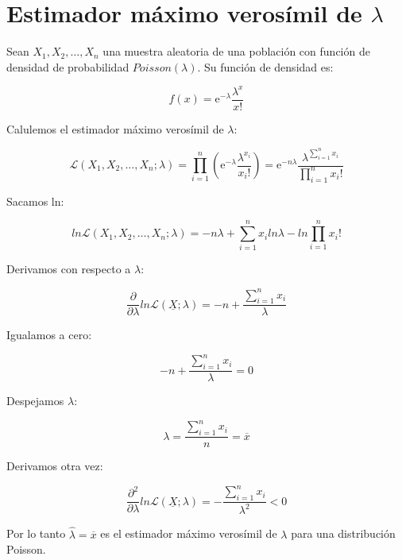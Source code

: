 \section{Estimador máximo verosímil de $\lambda$} \label{Apend_ResultadosUtiles}

Sean $X_{1}, X_{2}, \ldots, X_{n}$ una muestra aleatoria de una población con función de densidad de probabilidad $Poisson(\lambda)$. Su función de densidad es:

$$f(x) = \mathrm{e}^{-\lambda} \dfrac{\lambda^{x}}{x!}$$

Calulemos el estimador máximo verosímil de $\lambda$:

$$\mathcal{L}(X_{1}, X_{2},\ldots, X_{n}; \lambda) = \displaystyle \prod_{i = 1}^{n} \left( \mathrm{e}^{-\lambda} \dfrac{\lambda^{x_{i}}}{x_{i}!} \right) = \mathrm{e}^{-n \lambda} \dfrac{\lambda^{\displaystyle \sum_{i = 1}^{n} x_{i}}}{\displaystyle  \prod_{i = 1}^{n} x_{i}!}$$

Sacamos ln:

$$ln \mathcal{L}(X_{1}, X_{2}, \ldots, X_{n};\lambda) = -n\lambda + \displaystyle \sum_{i = 1}^{n} x_{i} ln \lambda - ln \displaystyle  \prod_{i = 1}^{n} x_{i}!$$

Derivamos con respecto a $\lambda$:

$$\dfrac{\partial}{\partial \lambda} ln \mathcal{L}(\underline{X};\lambda) = -n + \dfrac{\displaystyle \sum_{i = 1}^{n} x_{i}}{\lambda}$$

Igualamos a cero:

$$-n + \dfrac{\displaystyle \sum_{i = 1}^{n} x_{i}}{\lambda} = 0$$

Despejamos $\lambda$:

$$\lambda = \dfrac{\displaystyle \sum_{i = 1}^{n} x_{i}}{n} = \overline{x}$$

Derivamos otra vez:

$$\dfrac{\partial^{2}}{\partial \lambda} ln \mathcal{L}(\underline{X};\lambda)  = - \dfrac{\displaystyle \sum_{i = 1}^{n} x_{i}}{\lambda^{2}} < 0$$


Por lo tanto $\hat{\lambda} = \overline{x}$ es el estimador máximo verosímil de $\lambda$ para una distribución Poisson.
